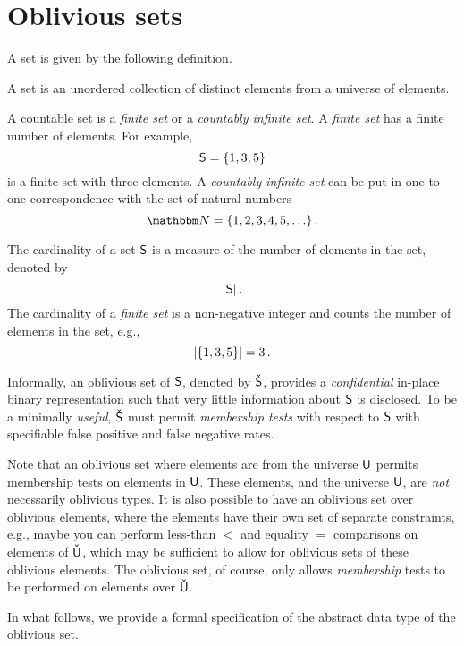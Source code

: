 \documentclass[ ../main.tex]{subfiles}
\begin{document}
\section{Oblivious sets}
\label{sec:ob_set_def}
A set is given by the following definition.
\begin{definition}
A set is an unordered collection of distinct elements from a universe of elements.
\end{definition}

A countable set is a \emph{finite set} or a \emph{countably infinite set}. A \emph{finite set} has a finite number of elements. For example,
\[
    \Set{S} = \{ 1, 3, 5 \}
\]
is a finite set with three elements. A \emph{countably infinite set} can be put in one-to-one correspondence with the set of natural numbers
\begin{equation}
    \NatSet = \{1,2,3,4,5,\ldots\}\,.
\end{equation}

The cardinality of a set $\Set{S}$ is a measure of the number of elements in the set, denoted by
\begin{equation}
    \Card{\Set{S}}\,.
\end{equation}
The cardinality of a \emph{finite set} is a non-negative integer and counts the number of elements in the set, e.g.,
\[
    \lvert\left\{ 1, 3, 5\right\}\rvert = 3\,.
\]

Informally, an oblivious set of $\Set{S}$, denoted by $\OSet{S}$, provides a \emph{confidential} in-place binary representation such that very little information about $\Set{S}$ is disclosed.
To be a minimally \emph{useful}, $\OSet{S}$ must permit \emph{membership tests} with respect to $\Set{S}$ with specifiable false positive and false negative rates.

Note that an oblivious set where elements are from the universe $\Set{U}$ permits membership tests on elements in $\Set{U}$.
These elements, and the universe $\Set{U}$, are \emph{not} necessarily oblivious types.
It is also possible to have an oblivious set over oblivious elements, where the elements have their own set of separate constraints, e.g., maybe you can perform less-than $<$ and equality $=$ comparisons on elements of $\OSet{U}$, which may be sufficient to allow for oblivious sets of these oblivious elements. The oblivious set, of course, only allows \emph{membership} tests to be performed on elements over $\OSet{U}$.


In what follows, we provide a formal specification of the abstract data type of the oblivious set.
\end{document}
